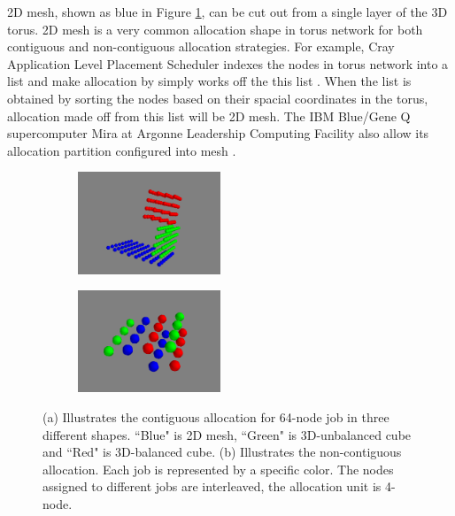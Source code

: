 \documentclass[conference]{IEEEtran}
\begin{document}
2D mesh, shown as blue in Figure \ref{fig:cont_sub1}, can be cut out from a single layer of the 3D torus. 2D mesh is a very common allocation shape in torus network for both contiguous and non-contiguous allocation strategies. For example, Cray Application Level Placement Scheduler indexes the nodes in torus network into a list and make allocation by simply works off the this list \cite{carl-cug}. When the list is obtained by sorting the nodes based on their spacial coordinates in the torus, allocation made off from this list will be 2D mesh. The IBM Blue/Gene Q supercomputer Mira at Argonne Leadership Computing Facility also allow its allocation partition configured into mesh \cite{zhou-ipdps}. 

\begin{figure}[t!]
    \centering
    \begin{subfigure}[t]{0.2\textwidth}
        \centering
        \includegraphics[height=1.2in]{figs/cont/allocation}
        \caption{ }
        \label{fig:cont_sub1}
    \end{subfigure}%
    \hspace{1em}%
    \begin{subfigure}[t]{0.2\textwidth}
        \centering
        \includegraphics[height=1.2in]{figs/inter-job/noncont/sharing}
        \caption{ }
        \label{fig:noncont_sub1}
    \end{subfigure}%
    \caption{(a) Illustrates the contiguous allocation for 64-node job in three different shapes. ``Blue" is 2D mesh, ``Green" is 3D-unbalanced cube and ``Red" is 3D-balanced cube. (b) Illustrates the non-contiguous allocation. Each job is represented by a specific color. The nodes assigned to different jobs are interleaved, the allocation unit is 4-node.}
\end{figure}
\end{document}

